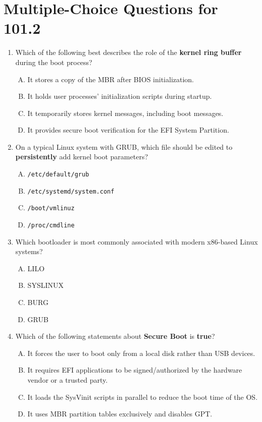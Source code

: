 \documentclass[12pt,a4paper]{report}
\begin{document}
\newpage
\section*{Multiple-Choice Questions for 101.2}

\begin{enumerate}[1.]
    \item Which of the following best describes the role of the \textbf{kernel ring buffer} during the boot process?
      \begin{enumerate}[A)]
        \item It stores a copy of the MBR after BIOS initialization.
        \item It holds user processes’ initialization scripts during startup.
        \item It temporarily stores kernel messages, including boot messages.
        \item It provides secure boot verification for the EFI System Partition.
      \end{enumerate}
    
    \item On a typical Linux system with GRUB, which file should be edited to \textbf{persistently} add kernel boot parameters?
      \begin{enumerate}[A)]
        \item \texttt{/etc/default/grub}
        \item \texttt{/etc/systemd/system.conf}
        \item \texttt{/boot/vmlinuz}
        \item \texttt{/proc/cmdline}
      \end{enumerate}
    
    \item Which bootloader is most commonly associated with modern x86-based Linux systems?
      \begin{enumerate}[A)]
        \item LILO
        \item SYSLINUX
        \item BURG
        \item GRUB
      \end{enumerate}
    
    \item Which of the following statements about \textbf{Secure Boot} is \textbf{true}?
      \begin{enumerate}[A)]
        \item It forces the user to boot only from a local disk rather than USB devices.
        \item It requires EFI applications to be signed/authorized by the hardware vendor or a trusted party.
        \item It loads the SysVinit scripts in parallel to reduce the boot time of the OS.
        \item It uses MBR partition tables exclusively and disables GPT.
      \end{enumerate}
    

\end{enumerate}
\end{document}
